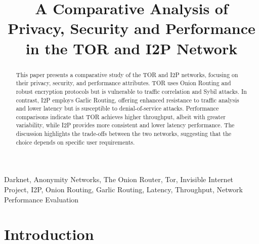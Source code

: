 \documentclass[12pt,conference]{IEEEtran}
\begin{document}
\title{A Comparative Analysis of Privacy, Security and Performance in the TOR and I2P Network}

\author{
\and
{}
\and
{}
}

\maketitle

\begin{abstract}
This paper presents a comparative study of the TOR and I2P networks, focusing on their privacy, security, and performance attributes. TOR uses Onion Routing and robust encryption protocols but is vulnerable to traffic correlation and Sybil attacks. In contrast, I2P employs Garlic Routing, offering enhanced resistance to traffic analysis and lower latency but is susceptible to denial-of-service attacks. Performance comparisons indicate that TOR achieves higher throughput, albeit with greater variability, while I2P provides more consistent and lower latency performance. The discussion highlights the trade-offs between the two networks, suggesting that the choice depends on specific user requirements.
\end{abstract}

\begin{IEEEkeywords}
Darknet, Anonymity Networks, The Onion Router, Tor, Invisible Internet Project, I2P, Onion Routing, Garlic Routing, Latency, Throughput, Network Performance Evaluation
\end{IEEEkeywords}

\section{Introduction}
\end{document}
